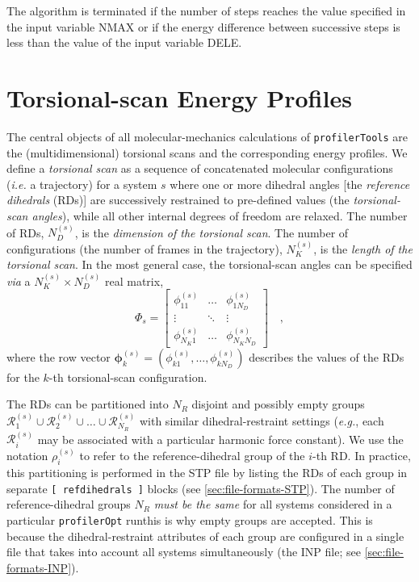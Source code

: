 \documentclass[10pt,a4paper,openany]{memoir}
\numberwithin{equation}{section}
\newcommand{\profileropt}[0]{\texttt{profilerOpt}}
\newcommand{\profilertools}[0]{\texttt{profilerTools}}
\begin{document}
The algorithm is terminated if the number of steps reaches the value specified in the input variable NMAX or if the energy difference between successive steps is less than the value of the input variable DELE.

\section{Torsional-scan Energy Profiles}
\label{sec:ga-tpes}

The central objects of all molecular-mechanics calculations of
\profilertools{} are the (multidimensional) torsional scans and the
corresponding energy profiles.
%
We define a \textit{torsional scan} as a sequence of concatenated
molecular configurations (\textit{i.e.} a trajectory) for a system $s$
where one or more dihedral angles [the \textit{reference dihedrals}
(RDs)] are successively restrained to pre-defined values (the
\textit{torsional-scan angles}), while all other internal degrees of
freedom are relaxed.
%
The number of RDs, $N_D^{(s)}$, is the \textit{dimension of the torsional
  scan}.
%
The number of configurations (the number of frames in the trajectory),
$N_K^{(s)}$, is the \textit{length of the torsional scan}.
%
In the most general case, the torsional-scan angles can be specified
\textit{via} a $N_K^{(s)} \times N_D^{(s)}$ real matrix,
\begin{equation}
  \label{eq:spec-matrix}
  \Phi_s = \left[
    \begin{array}{ccc}
      \phi_{11}^{(s)} & \ldots & \phi_{1N_D}^{(s)} \\
      \vdots & \ddots & \vdots \\
      \phi_{N_K1}^{(s)} & \ldots & \phi_{N_KN_D}^{(s)}
  \end{array}
  \right] \quad ,
\end{equation}
where the row vector
\( \boldsymbol{\phi}_k^{(s)} = (\phi_{k1}^{(s)},\ldots,\phi_{kN_D}^{(s)} ) \) describes
the values of the RDs for the $k$-th torsional-scan configuration.

The RDs can be partitioned into $N_R$ disjoint and possibly empty
groups
$\mathcal{R}_1^{(s)} \cup \mathcal{R}_2^{(s)} \cup \ldots \cup
\mathcal{R}_{N_R}^{(s)}$ with similar dihedral-restraint settings
(\textit{e.g.}, each $\mathcal{R}_i^{(s)}$ may be associated with a
particular harmonic force constant).  We use the notation
$\rho_i^{(s)}$ to refer to the reference-dihedral group of the $i$-th
RD. In practice, this partitioning is performed in the STP file by
listing the RDs of each group in separate \texttt{[~refdihedrals~]}
blocks (see \autoref{sec:file-formats-STP}).  The number of
reference-dihedral groups $N_R$ \textit{must be the same} for all
systems considered in a particular \profileropt{} run\textemdash{}this
is why empty groups are accepted.  This is because the
dihedral-restraint attributes of each group are configured in a single
file that takes into account all systems simultaneously (the INP file;
see \autoref{sec:file-formats-INP}).
\end{document}
